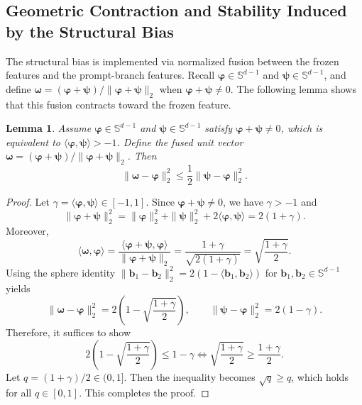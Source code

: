 \documentclass{article}
\theoremstyle{plain}
\newtheorem{lemma}[theorem]{Lemma}
\theoremstyle{definition}
\theoremstyle{remark}
\begin{document}
	\subsection{Geometric Contraction and Stability Induced by the Structural Bias}
	\label{app:structural_contraction}
	The structural bias is implemented via normalized fusion between the frozen features and the prompt-branch features.
	Recall $\boldsymbol{\varphi}\in\mathbb S^{d-1}$ and $\boldsymbol{\psi}\in\mathbb S^{d-1}$, and define $\boldsymbol{\omega}=(\boldsymbol{\varphi}+\boldsymbol{\psi})/\|\boldsymbol{\varphi}+\boldsymbol{\psi}\|_2$ when $\boldsymbol{\varphi}+\boldsymbol{\psi}\neq 0$.
	The following lemma shows that this fusion contracts toward the frozen feature.
	\begin{lemma}\label{lem:app_contract}
		Assume $\boldsymbol{\varphi}\in\mathbb S^{d-1}$ and $\boldsymbol{\psi}\in\mathbb S^{d-1}$ satisfy $\boldsymbol{\varphi}+\boldsymbol{\psi}\neq 0$, which is equivalent to $\langle \boldsymbol{\varphi},\boldsymbol{\psi}\rangle>-1$.
		Define the fused unit vector $\boldsymbol{\omega}=(\boldsymbol{\varphi}+\boldsymbol{\psi})/\|\boldsymbol{\varphi}+\boldsymbol{\psi}\|_2$.
		Then
		\begin{equation*}
			\|\boldsymbol{\omega}-\boldsymbol{\varphi}\|_2^2 \le \frac12\|\boldsymbol{\psi}-\boldsymbol{\varphi}\|_2^2.
		\end{equation*}
	\end{lemma}
	\begin{proof}
		Let $\gamma=\langle \boldsymbol{\varphi},\boldsymbol{\psi}\rangle\in[-1,1]$. Since $\boldsymbol{\varphi}+\boldsymbol{\psi}\neq 0$, we have $\gamma>-1$ and
		\begin{equation*}
			\|\boldsymbol{\varphi}+\boldsymbol{\psi}\|_2^2=\|\boldsymbol{\varphi}\|_2^2+\|\boldsymbol{\psi}\|_2^2+2\langle \boldsymbol{\varphi},\boldsymbol{\psi}\rangle=2(1+\gamma).
		\end{equation*}
		Moreover,
		\begin{equation*}
			\langle \boldsymbol{\omega},\boldsymbol{\varphi}\rangle=\frac{\langle \boldsymbol{\varphi}+\boldsymbol{\psi},\boldsymbol{\varphi}\rangle}{\|\boldsymbol{\varphi}+\boldsymbol{\psi}\|_2}
			=\frac{1+\gamma}{\sqrt{2(1+\gamma)}}
			=\sqrt{\frac{1+\gamma}{2}}.
		\end{equation*}
		Using the sphere identity $\|\mathbf{b}_1-\mathbf{b}_2\|_2^2=2(1-\langle \mathbf{b}_1,\mathbf{b}_2\rangle)$ for $\mathbf{b}_1,\mathbf{b}_2\in\mathbb S^{d-1}$ yields
		\begin{equation*}
			\|\boldsymbol{\omega}-\boldsymbol{\varphi}\|_2^2
			=2\left(1-\sqrt{\frac{1+\gamma}{2}}\right),
			\qquad
			\|\boldsymbol{\psi}-\boldsymbol{\varphi}\|_2^2=2(1-\gamma).
		\end{equation*}
		Therefore, it suffices to show
		\begin{equation*}
			2\left(1-\sqrt{\frac{1+\gamma}{2}}\right)\le 1-\gamma
			\iff
			\sqrt{\frac{1+\gamma}{2}} \ge \frac{1+\gamma}{2}.
		\end{equation*}
		Let $q=(1+\gamma)/2\in(0,1]$. Then the inequality becomes $\sqrt{q}\ge q$, which holds for all $q\in[0,1]$.
		This completes the proof.
	\end{proof}
\end{document}
